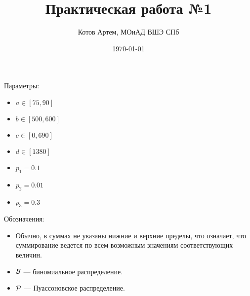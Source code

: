 \documentclass[a4paper,12pt]{article}
\author{Котов Артем, МОиАД ВШЭ СПб}
\title{Практическая работа №1}
\date{\today}
\begin{document}
\maketitle
\tableofcontents
\newpage


\no Параметры:
\begin{itemize}
    \item $a \in [75, 90]$
    \item $b \in [500, 600]$
    \item $c \in [0, 690]$
    \item $d \in [1380]$
    \item $p_1 = 0.1$
    \item $p_2 = 0.01$
    \item $p_3 = 0.3$
\end{itemize}

\no Обозначения:
\begin{itemize}
    \item Обычно, в суммах не указаны нижние и верхние пределы, что означает, что суммирование ведется по всем возможным значениям соответствующих величин.
    \item $\mathcal{B}$ --- биномиальное распределение.
    \item $\mathcal{P}$ --- Пуассоновское распределение.
\end{itemize}









\end{document}
